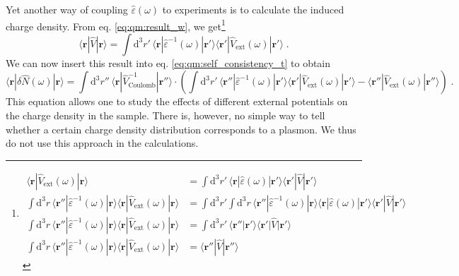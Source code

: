 \documentclass[a4paper,12pt]{article}
\begin{document}
    Yet another way of coupling $\hat\varepsilon(\omega)$ to experiments is to calculate the induced charge density. From eq. \eqref{eq:qm:result_w}, we get\footnote{ %
        \begin{equation*}
        \begin{aligned}
            \langle\mathbf{r} |\hat V_\text{ext}(\omega)| \mathbf{r}\rangle &= \int\!\!\text{d}^3r'\, \langle\mathbf{r} |\hat\varepsilon(\omega)| \mathbf{r'}\rangle\langle\mathbf{r'} |\hat V|\mathbf{r'}\rangle \\
            \int\!\!\text{d}^3r\,\langle\mathbf{r''}|\hat\varepsilon^{-1}(\omega)|\mathbf{r}\rangle\langle\mathbf{r} |\hat V_\text{ext}(\omega)| \mathbf{r}\rangle &= \int\!\!\text{d}^3r'\!\!\!\int\!\!\text{d}^3r\,\langle\mathbf{r''} |\hat\varepsilon^{-1}(\omega) |\mathbf{r}\rangle\langle\mathbf{r} |\hat\varepsilon(\omega)| \mathbf{r'}\rangle\langle\mathbf{r'} |\hat V| \mathbf{r'}\rangle \\
            \int\!\!\text{d}^3r\,\langle\mathbf{r''} |\hat\varepsilon^{-1}(\omega)| \mathbf{r}\rangle \langle\mathbf{r} |\hat V_\text{ext}(\omega)| \mathbf{r}\rangle &= \int\!\!\text{d}^3r'\,\langle\mathbf{r''} | \mathbf{r'}\rangle \langle\mathbf{r'} |\hat V| \mathbf{r'}\rangle \\
            \int\!\!\text{d}^3r\,\langle\mathbf{r''} |\hat\varepsilon^{-1}(\omega)| \mathbf{r}\rangle \langle\mathbf{r} |\hat V_\text{ext}(\omega)| \mathbf{r}\rangle &= \langle\mathbf{r''} |\hat V| \mathbf{r''}\rangle
        \end{aligned}
        \end{equation*}
    }
    \begin{equation*}
        \langle\mathbf{r} |\hat V| \mathbf{r}\rangle = \int\!\!\text{d}^3r'\,\langle\mathbf{r} |\hat\varepsilon^{-1}(\omega)| \mathbf{r'}\rangle \langle\mathbf{r'} |\hat V_\text{ext}(\omega)| \mathbf{r'}\rangle\; .
    \end{equation*}
    We can now insert this result into eq. \eqref{eq:qm:self_consistency_t} to obtain
    \begin{equation} \label{eq:exp:charge_density}
        \langle\mathbf{r} |\delta\hat N(\omega)| \mathbf{r}\rangle = \int\!\!\text{d}^3r''\, \langle\mathbf{r} |\hat V^{-1}_\text{Coulomb}| \mathbf{r''}\rangle \cdot \left( \int\!\!\text{d}^3r'\, \langle\mathbf{r''} |\hat\varepsilon^{-1}(\omega)| \mathbf{r'}\rangle\langle\mathbf{r'} |\hat V_\text{ext}(\omega)| \mathbf{r'}\rangle - \langle\mathbf{r''} |\hat V_\text{ext}(\omega)| \mathbf{r''}\rangle \!\right) \; .
    \end{equation}
    This equation allows one to study the effects of different external potentials on the charge density in the sample. There is, however, no simple way to tell whether a certain charge density distribution corresponds to a plasmon. We thus do not use this approach in the calculations.
\end{document}
